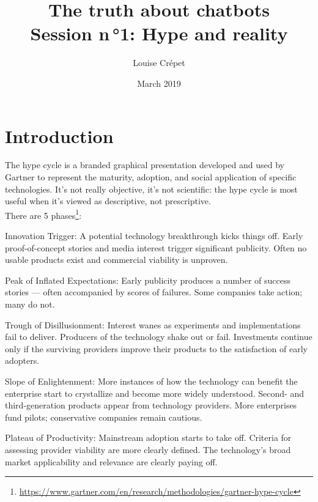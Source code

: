 \documentclass{article}
\title{The truth about chatbots \\[0.4em]\smaller{}Session n\,°1: Hype and reality}
\author{Louise Crépet}
\date{March 2019}
\begin{document}
\maketitle

\section{Introduction}

The hype cycle is a branded graphical presentation developed and used by Gartner to represent the maturity, adoption, and social application of specific technologies. It’s not really objective, it’s not scientific: the hype cycle is most useful when it’s viewed as descriptive, not prescriptive.\\
There are 5 phases\footnote{\url{https://www.gartner.com/en/research/methodologies/gartner-hype-cycle}}:
\begin{description}
    \item Innovation Trigger: A potential technology breakthrough kicks things off. Early proof-of-concept stories and media interest trigger significant publicity. Often no usable products exist and commercial viability is unproven.
    \item Peak of Inflated Expectations: Early publicity produces a number of success stories — often accompanied by scores of failures. Some companies take action; many do not.
    \item Trough of Disillusionment: Interest wanes as experiments and implementations fail to deliver. Producers of the technology shake out or fail. Investments continue only if the surviving providers improve their products to the satisfaction of early adopters.
    \item Slope of Enlightenment: More instances of how the technology can benefit the enterprise start to crystallize and become more widely understood. Second- and third-generation products appear from technology providers. More enterprises fund pilots; conservative companies remain cautious.
    \item Plateau of Productivity: Mainstream adoption starts to take off. Criteria for assessing provider viability are more clearly defined. The technology's broad market applicability and relevance are clearly paying off.
\end{description}
\end{document}
